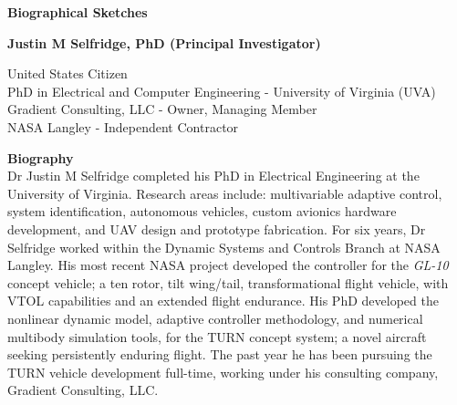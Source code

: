 \documentclass[11pt]{article}
\begin{document}
\newpage
{\bf \Huge Biographical Sketches}


\vspace{0.2cm}
{\bf \Large Justin M Selfridge, PhD (Principal Investigator)}

United States Citizen \\
PhD in Electrical and Computer 
Engineering - University of Virginia (UVA) \\
Gradient Consulting, LLC - Owner, Managing Member \\
NASA Langley - Independent Contractor


{\bf Biography} \\
Dr Justin M Selfridge completed his PhD in Electrical Engineering at the University of Virginia.  Research areas include: multivariable adaptive control, system identification, autonomous vehicles, custom avionics hardware development, and UAV design and prototype fabrication.  For six years, Dr Selfridge worked within the Dynamic Systems and Controls Branch at NASA Langley.  His most recent NASA project developed the controller for the \emph{GL-10} concept vehicle; a ten rotor, tilt wing/tail, transformational flight vehicle, with VTOL capabilities and an extended flight endurance.  His PhD developed the nonlinear dynamic model, adaptive controller methodology, and numerical multibody simulation tools, for the TURN concept system; a novel aircraft seeking persistently enduring flight.  The past year he has been pursuing the TURN vehicle development full-time, working under his consulting company, Gradient Consulting, LLC.
\end{document}
